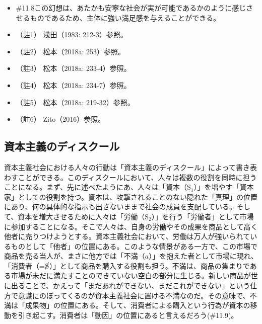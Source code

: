 \begin{note}{}
  \begin{itemize}
    \tightlist
    \item{\#11.8}この幻想は、あたかも安寧な社会が実が可能であるかのように感じさせるものであるため、主体に強い満足感を与えることができる。
  \end{itemize}
\end{note}

\begin{itemize}
\tightlist
\item
  （註1） 浅田（1983: 212-3）\cite{Asada}参照。
\item
  （註2） 松本（2018a: 253）\cite{Matsumoto1}参照。
\item
  （註3） 松本（2018a: 233-4）\cite{Matsumoto1}参照。
\item
  （註4） 松本（2018a: 234-7）\cite{Matsumoto1}参照。
\item
  （註5） 松本（2018a: 219-32）\cite{Matsumoto1}参照。
\item
  （註6） Zito（2016）\cite{Zito}参照。
\end{itemize}

\subsection{資本主義のディスクール}\label{ux8cc7ux672cux4e3bux7fa9ux306eux30c7ux30a3ux30b9ux30afux30fcux30eb}

資本主義社会における人々の行動は「資本主義のディスクール」によって書き表わすことができる。このディスクールにおいて、人々は複数の役割を同時に担うことになる。まず、先に述べたようにあ、人々は「資本（\(\textrm{S}_1\)）」を増やす「資本家」としての役割を持つ。資本は、攻撃されることのない隠れた「真理」の位置にあり、何の具体的な指示も出さないままで社会の成員を支配している。そして、資本を増大させるために人々は「労働（\(\textrm{S}_2\)）」を行う「労働者」として市場に参加することになる。そこで人々は、自身の労働やその成果を商品として高く他者に売りつけようとする。資本主義社会において、労働は万人が強いられているものとして「他者」の位置にある。このような情景がある一方で、この市場で商品を売る当人が、まさに他方では「不満（\(a\)）」を抱えた者として市場に現れ、「消費者（=\(\cancel{\textrm{S}}\)）」として商品を購入する役割も担う。不満は、商品の集まりである市場が未だに満たすことのできていない空白の部分に生じる。新しい商品が世に出ることで、かえって「まだあれができない、まだこれができない」という仕方で意識にのぼってくるのが資本主義社会に置ける不満なのだ。その意味で、不満は「成果物」の位置にある。そして、消費者による購入という行為が資本の移動を引き起こす。消費者は「動因」の位置にあると言えるだろう(\#11.9)。

